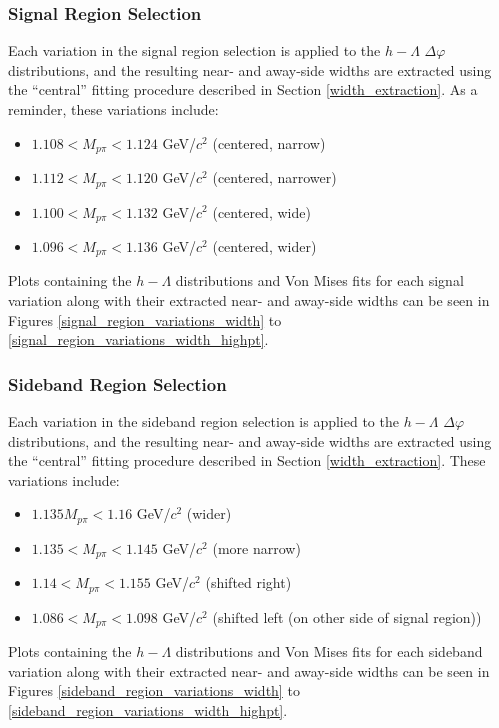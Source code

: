 \documentclass[ALICE,manyauthors]{ALICE_analysis_notes}
\begin{document}
\subsubsection{Signal Region Selection}
\label{signal_region_selection_systematics_width}
Each variation in the signal region selection is applied to the $h-\Lambda$ $\Delta\varphi$ distributions, and the resulting near- and away-side widths are extracted using the ``central'' fitting procedure described in Section \ref{width_extraction}. As a reminder, these variations include:

\begin{itemize}
\item $1.108 < M_{p\pi} < 1.124$ GeV/$c^2$ (centered, narrow)
\item $1.112 < M_{p\pi} < 1.120$ GeV/$c^2$ (centered, narrower)
\item $1.100 < M_{p\pi} < 1.132$ GeV/$c^2$ (centered, wide)
\item $1.096 < M_{p\pi} < 1.136$ GeV/$c^2$ (centered, wider)
\end{itemize}

Plots containing the $h-\Lambda$ distributions and Von Mises fits for each signal variation along with their extracted near- and away-side widths can be seen in Figures \ref{signal_region_variations_width} to \ref{signal_region_variations_width_highpt}.

\subsubsection{Sideband Region Selection}
\label{sideband_region_selection_systematics_width}
Each variation in the sideband region selection is applied to the $h-\Lambda$ $\Delta\varphi$ distributions, and the resulting near- and away-side widths are extracted using the ``central'' fitting procedure described in Section \ref{width_extraction}. These variations include:

\begin{itemize}
\item $1.135 M_{p\pi} < 1.16$ GeV/$c^2$ (wider)
\item $1.135 < M_{p\pi} < 1.145$ GeV/$c^2$ (more narrow)
\item $1.14 < M_{p\pi} < 1.155$ GeV/$c^2$ (shifted right)
\item $1.086 < M_{p\pi} < 1.098$ GeV/$c^2$ (shifted left (on other side of signal region))
\end{itemize}

Plots containing the $h-\Lambda$ distributions and Von Mises fits for each sideband variation along with their extracted near- and away-side widths can be seen in Figures \ref{sideband_region_variations_width} to \ref{sideband_region_variations_width_highpt}.
\end{document}

